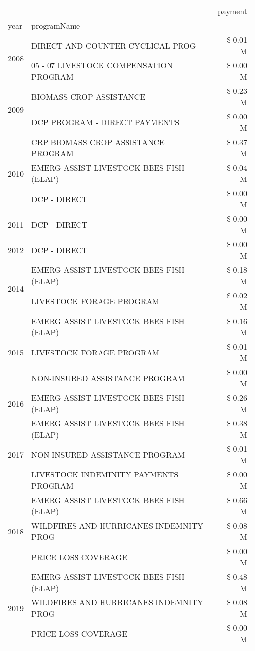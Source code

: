 \begin{tabular}{llr}
\toprule
 &  & payment \\
year & programName &  \\
\midrule
\multirow[t]{2}{*}{2008} & DIRECT AND COUNTER CYCLICAL PROG & \$ 0.01 M \\
 & 05 - 07 LIVESTOCK COMPENSATION PROGRAM & \$ 0.00 M \\
\cline{1-3}
\multirow[t]{2}{*}{2009} & BIOMASS CROP ASSISTANCE & \$ 0.23 M \\
 & DCP PROGRAM - DIRECT PAYMENTS & \$ 0.00 M \\
\cline{1-3}
\multirow[t]{3}{*}{2010} & CRP BIOMASS CROP ASSISTANCE PROGRAM & \$ 0.37 M \\
 & EMERG ASSIST LIVESTOCK BEES FISH (ELAP) & \$ 0.04 M \\
 & DCP - DIRECT & \$ 0.00 M \\
\cline{1-3}
2011 & DCP - DIRECT & \$ 0.00 M \\
\cline{1-3}
2012 & DCP - DIRECT & \$ 0.00 M \\
\cline{1-3}
\multirow[t]{2}{*}{2014} & EMERG ASSIST LIVESTOCK BEES FISH (ELAP) & \$ 0.18 M \\
 & LIVESTOCK FORAGE PROGRAM & \$ 0.02 M \\
\cline{1-3}
\multirow[t]{3}{*}{2015} & EMERG ASSIST LIVESTOCK BEES FISH (ELAP) & \$ 0.16 M \\
 & LIVESTOCK FORAGE PROGRAM & \$ 0.01 M \\
 & NON-INSURED ASSISTANCE PROGRAM & \$ 0.00 M \\
\cline{1-3}
2016 & EMERG ASSIST LIVESTOCK BEES FISH (ELAP) & \$ 0.26 M \\
\cline{1-3}
\multirow[t]{3}{*}{2017} & EMERG ASSIST LIVESTOCK BEES FISH (ELAP) & \$ 0.38 M \\
 & NON-INSURED ASSISTANCE PROGRAM & \$ 0.01 M \\
 & LIVESTOCK INDEMINITY PAYMENTS PROGRAM & \$ 0.00 M \\
\cline{1-3}
\multirow[t]{3}{*}{2018} & EMERG ASSIST LIVESTOCK BEES FISH (ELAP) & \$ 0.66 M \\
 & WILDFIRES AND HURRICANES INDEMNITY PROG & \$ 0.08 M \\
 & PRICE LOSS COVERAGE & \$ 0.00 M \\
\cline{1-3}
\multirow[t]{3}{*}{2019} & EMERG ASSIST LIVESTOCK BEES FISH (ELAP) & \$ 0.48 M \\
 & WILDFIRES AND HURRICANES INDEMNITY PROG & \$ 0.08 M \\
 & PRICE LOSS COVERAGE & \$ 0.00 M \\

\end{tabular}
